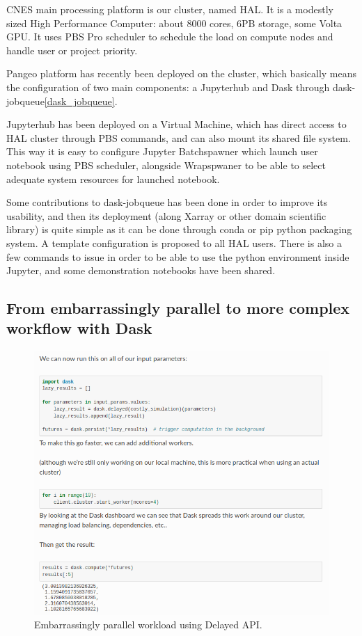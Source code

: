 \documentclass{article}
\begin{document}
CNES main processing platform is our cluster, named HAL. It is a modestly sized High Performance Computer: about 8000 cores, 6PB storage, some Volta GPU. It uses PBS Pro scheduler to schedule the load on compute nodes and handle user or project priority.

Pangeo platform has recently been deployed on the cluster, which basically means the configuration of two main components: a Jupyterhub and Dask through dask-jobqueue\ref{dask_jobqueue}.

Jupyterhub has been deployed on a Virtual Machine, which has direct access to HAL cluster through PBS commands, and can also mount its shared file system. This way it is easy to configure Jupyter Batchspawner which launch user notebook using PBS scheduler, alongside Wrapspwaner to be able to select adequate system resources for launched notebook. 

Some contributions to dask-jobqueue has been done in order to improve its usability, and then its deployment (along Xarray or other domain scientific library) is quite simple as it can be done through conda or pip python packaging system. A template configuration is proposed to all HAL users. There is also a few commands to issue in order to be able to use the python environment inside Jupyter, and some demonstration notebooks have been shared.

\subsection{From embarrassingly parallel to more complex workflow with Dask}
\label{ssec:usecase1}

\begin{figure}
  \centering
  \includegraphics[width=\columnwidth]{ep_dask_code.png}
  \caption{\label{ep_dask_code} Embarrassingly parallel workload using Delayed API.}
\end{figure}
\end{document}
